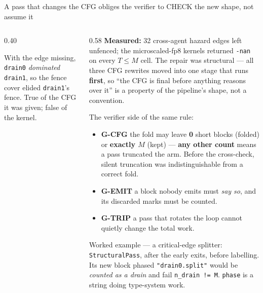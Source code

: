 \documentclass[aspectratio=169,9pt]{beamer}
\newcommand{\tsub}[1]{{\footnotesize\color{gray}#1}}
\newcommand{\key}[1]{\textcolor{acc}{\textbf{#1}}}
\newcommand{\bad}[1]{\textcolor{warn}{\textbf{#1}}}
\newcommand{\good}[1]{\textcolor{ok}{\textbf{#1}}}
\begin{document}
\begin{frame}{A pass that changes the CFG obliges the verifier to CHECK the new shape, not assume it}
\begin{columns}[T]
\begin{column}{0.40\textwidth}
\centering
{}

\vspace{2pt}
\tsub{With the edge missing, \texttt{drain0} \emph{dominated} \texttt{drain1}, so the fence cover
elided \texttt{drain1}'s fence. True of the CFG it was given; false of the kernel.}
\end{column}
\begin{column}{0.58\textwidth}
\scriptsize
\bad{Measured:} 32 cross-agent hazard edges left unfenced; the microscaled-fp8 kernels returned
\texttt{-nan} on every $T \le M$ cell. The repair was structural --- all three CFG rewrites moved
into one stage that runs \key{first}, so ``the CFG is final before anything reasons over it'' is a
property of the pipeline's shape, not a convention.

\vspace{4pt}
The verifier side of the same rule:
\begin{itemize}\itemsep2pt
  \item \key{G-CFG} the fold may leave \good{0} short blocks (folded) or \good{exactly $M$} (kept)
        --- \bad{any other count} means a pass truncated the arm. Before the cross-check, silent
        truncation was indistinguishable from a correct fold.
  \item \key{G-EMIT} a block nobody emits must \emph{say so}, and its discarded marks must be counted.
  \item \key{G-TRIP} a pass that rotates the loop cannot quietly change the total work.
\end{itemize}

\vspace{3pt}
\tsub{Worked example --- a critical-edge splitter: \texttt{StructuralPass}, after the early exits,
before labelling. Its new block phased \texttt{"drain0.split"} would be \emph{counted as a drain} and
fail \texttt{n\_drain != M}. \texttt{phase} is a string doing type-system work.}
\end{column}
\end{columns}
\end{frame}
\end{document}
